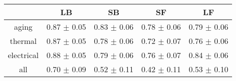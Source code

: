 \begin{tabular}{c c c c c }
\hline
 & LB & SB & SF & LF \\
\hline
aging & 0.87 $\pm$ 0.05 & 0.83 $\pm$ 0.06 & 0.78 $\pm$ 0.06 & 0.79 $\pm$ 0.06 \\
thermal & 0.87 $\pm$ 0.05 & 0.78 $\pm$ 0.06 & 0.72 $\pm$ 0.07 & 0.76 $\pm$ 0.06 \\
electrical & 0.88 $\pm$ 0.05 & 0.79 $\pm$ 0.06 & 0.76 $\pm$ 0.07 & 0.84 $\pm$ 0.06 \\
all & 0.70 $\pm$ 0.09 & 0.52 $\pm$ 0.11 & 0.42 $\pm$ 0.11 & 0.53 $\pm$ 0.10 \\
\hline
\end{tabular}